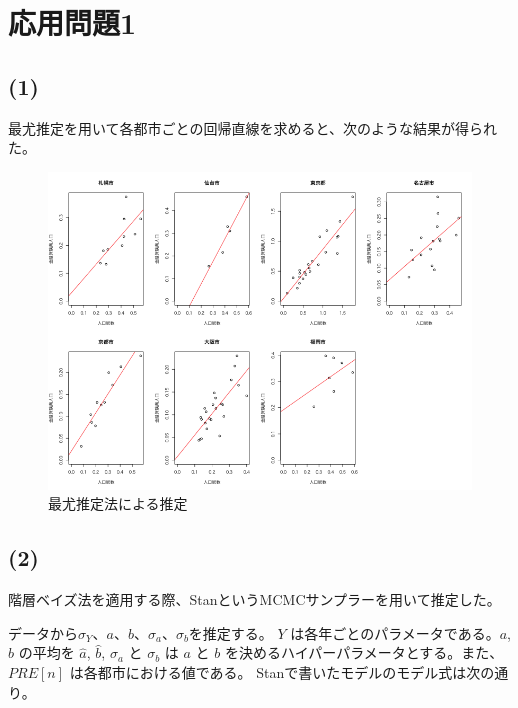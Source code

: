 \section*{応用問題1}\label{ux5fdcux7528ux554fux984c1}

\subsection*{(1)}\label{section}

最尤推定を用いて各都市ごとの回帰直線を求めると、次のような結果が得られた。

\begin{figure}
\centering
\includegraphics[width=14.00000cm]{../src/output/image/regression.png}
\caption{最尤推定法による推定}
\end{figure}

\subsection*{(2)}\label{section-1}

階層ベイズ法を適用する際、StanというMCMCサンプラーを用いて推定した。

データから\(\sigma_Y\)、\(a\)、\(b\)、\(\sigma_a\)、\(\sigma_b\)を推定する。
\(Y\) は各年ごとのパラメータである。\(a\), \(b\) の平均を \(\hat{a}\),
\(\hat{b}\), \(\sigma_a\) と \(\sigma_b\) は \(a\) と \(b\)
を決めるハイパーパラメータとする。また、 \(PRE[n]\)
は各都市における値である。 Stanで書いたモデルのモデル式は次の通り。

